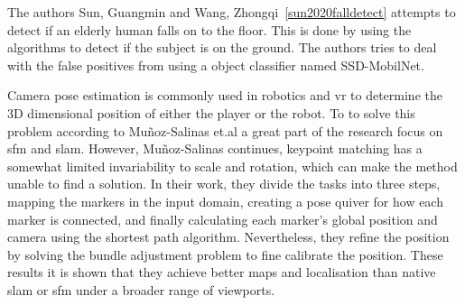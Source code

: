 The authors Sun, Guangmin and Wang, Zhongqi~\ref{sun2020falldetect} attempts to detect if an elderly human falls on to the floor.
This is done by using the \opnepose algorithms to detect if the subject is on the ground.
The authors tries to deal with the false positives from \openpose using a object classifier named SSD-MobilNet.


Camera pose estimation is commonly used in robotics and \ac{vr} to determine the 3D dimensional position of either the player or the robot.
To to solve this problem according to Mu{\~n}oz-Salinas et.al\cite{munoz2018mapping} a great part of the research focus on \ac{sfm} and \ac{slam}.
However, Mu{\~n}oz-Salinas continues, keypoint matching has a somewhat limited invariability to scale and rotation, which can make the method unable to find a solution.
In their work, they divide the tasks into three steps, mapping the markers in the input domain, creating a pose quiver for how each marker is connected, and finally calculating each marker's global position and camera using the shortest path algorithm.
Nevertheless, they refine the position by solving the bundle adjustment problem to fine calibrate the position.
These results it is shown that they achieve better maps and localisation than native \ac{slam} or \ac{sfm} under a broader range of viewports.



